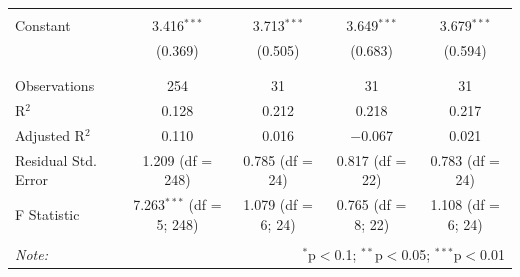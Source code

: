 \documentclass[
]{article}
\begin{document}
\begin{table}[!htbp]
\begin{tabular}{@{\extracolsep{5pt}}lcccc}
  & & & & \\ 
 Constant & 3.416$^{***}$ & 3.713$^{***}$ & 3.649$^{***}$ & 3.679$^{***}$ \\ 
  & (0.369) & (0.505) & (0.683) & (0.594) \\ 
  & & & & \\ 
\hline \\[-1.8ex] 
Observations & 254 & 31 & 31 & 31 \\ 
R$^{2}$ & 0.128 & 0.212 & 0.218 & 0.217 \\ 
Adjusted R$^{2}$ & 0.110 & 0.016 & $-$0.067 & 0.021 \\ 
Residual Std. Error & 1.209 (df = 248) & 0.785 (df = 24) & 0.817 (df = 22) & 0.783 (df = 24) \\ 
F Statistic & 7.263$^{***}$ (df = 5; 248) & 1.079 (df = 6; 24) & 0.765 (df = 8; 22) & 1.108 (df = 6; 24) \\ 
\hline 
\hline \\[-1.8ex] 
\textit{Note:}  & \multicolumn{4}{r}{$^{*}$p$<$0.1; $^{**}$p$<$0.05; $^{***}$p$<$0.01} \\ 
\end{tabular} 
\end{table} 
\endgroup
\end{document}
